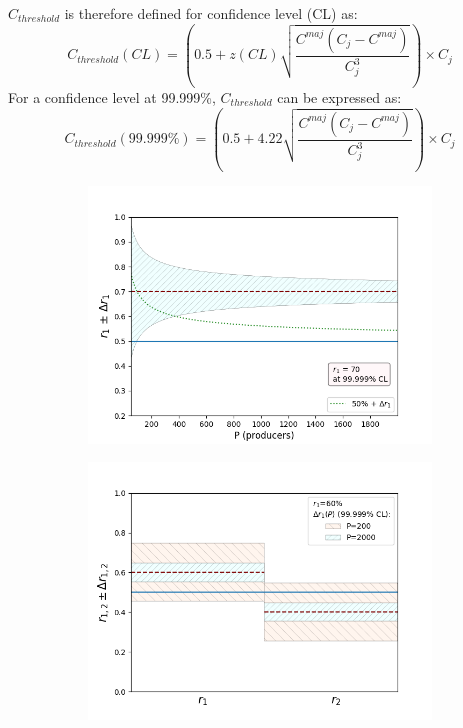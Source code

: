 \begin{enumerate}
 $C_{threshold}$ is therefore defined for confidence level (CL) as:
 \begin{equation}
 C_{threshold}(CL) = \left( 0.5 + z(CL)\sqrt{\frac{C^{maj}(C_j-C^{maj})}{C_j^3}} \right) \times C_j
 \end{equation}
 For a confidence level at 99.999\%, $C_{threshold}$ can be expressed as:
 \begin{equation}
 C_{threshold}(99.999\%) = \left( 0.5 + 4.22\sqrt{\frac{C^{maj}(C_j-C^{maj})}{C_j^3}} \right) \times C_j
 \end{equation}
 
 \begin{figure}[H]
 \centering
    \begin{subfigure}[b]{0.45\textwidth}
        \includegraphics[width=\textwidth]{Figures/r_over_P_at_70}
        \label{fig:rrdeltarb}
    \end{subfigure}
    \begin{subfigure}[b]{0.45\textwidth}
        \includegraphics[width=\textwidth]{Figures/r_pm_deltar_at_60}

\end{subfigure}
\end{figure}
\end{enumerate}
